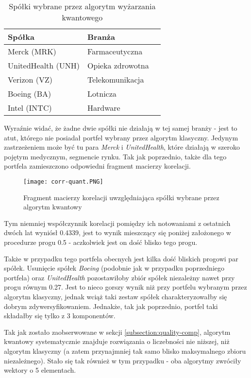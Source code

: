 \documentclass[12pt,a4paper,twoside,openany]{book}
\begin{document}
\begin{table}[h!]
\caption{Spółki wybrane przez algorytm wyżarzania kwantowego}
\label{table:assets-quantum}
\begin{tabularx}{0.8\textwidth} { 
  | >{\raggedright\arraybackslash}X 
  | >{\centering\arraybackslash}X 
  | >{\raggedleft\arraybackslash}X | }
 \hline
 \textbf{Spółka} & \textbf{Branża} \\
 \hline
 Merck (MRK)  & Farmaceutyczna \\
\hline
UnitedHealth (UNH)  & Opieka zdrowotna  \\
\hline
Verizon (VZ)  & Telekomunikacja \\
\hline
Boeing (BA)  & Lotnicza \\
\hline
Intel (INTC)  & Hardware \\
\hline

\end{tabularx}
\end{table}

Wyraźnie widać, że żadne dwie spółki nie działają w tej samej branży - jest to atut, którego nie posiadał portfel wybrany przez algorytm klasyczny.
Jedynym zastrzeżeniem może być tu para \textit{Merck} i \textit{UnitedHealth}, które działają w szeroko pojętym medycznym, segmencie rynku.
Tak jak poprzednio, także dla tego portfela zamieszczono odpowiedni fragment macierzy korelacji.

\begin{figure}[H]
\texttt{[image: corr-quant.PNG]}
\caption{Fragment macierzy korelacji uwzględniająca spółki wybrane przez algorytm kwantowy}
\end{figure}

Tym niemniej współczynnik korelacji pomiędzy ich notowaniami z ostatnich dwóch lat wyniósł 0.4339, jest to wynik mieszczący się poniżej założonego w procedurze progu 0.5 - aczkolwiek jest on dość blisko tego progu.

Także w przypadku tego portfela obecnych jest kilka dość bliskich progowi par spółek.
Usunięcie spółek \textit{Boeing} (podobnie jak w przypadku poprzedniego portfela) oraz \textit{UnitedHealth} pozostawiłoby zbiór spółek niezależny nawet przy progu równym 0.27.
Jest to nieco gorszy wynik niż przy portfelu wybranym przez algorytm klasyczny, jednak wciąż taki zestaw spółek charakteryzowałby się dobrym zdywersyfikowaniem.
Jednakże, tak jak poprzednio, portfel taki składałby się tylko z 3 komponentów.

Tak jak zostało zaobserwowane w sekcji \ref{subsection:quality-comp}, algorytm kwantowy systematycznie znajduje rozwiązania o liczebności nie niższej, niż algorytm klasyczny (a zatem przynajmniej tak samo blisko maksymalnego zbioru niezależnego).
Stało się tak również w tym przypadku - oba algorytmy zwróciły wektory o 5 elementach.
\end{document}
